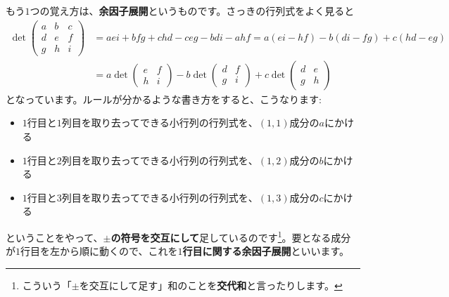 もう$1$つの覚え方は、\textbf{余因子展開}というものです。さっきの行列式をよく見ると
\begin{align*}
\det
\begin{pmatrix}
a & b & c \\
d & e & f \\
g & h & i
\end{pmatrix}
&=  aei + bfg + chd - ceg - bdi - ahf
= a(ei - hf) - b(di - fg) + c(hd - eg) \\
&=
a \det
\begin{pmatrix}
e & f \\
h & i
\end{pmatrix}
- b \det
\begin{pmatrix}
d & f \\
g & i
\end{pmatrix}
+ c \det
\begin{pmatrix}
d & e \\
g & h
\end{pmatrix}
\end{align*}
となっています。ルールが分かるような書き方をすると、こうなります:
\begin{itemize}
\item \uline{$1$}行目と\uline{$1$}列目を取り去ってできる小行列の行列式を、\uline{$(1, 1)$}成分の$a$にかける
\item \uline{$1$}行目と\uline{$2$}列目を取り去ってできる小行列の行列式を、\uline{$(1, 2)$}成分の$b$にかける
\item \uline{$1$}行目と\uline{$3$}列目を取り去ってできる小行列の行列式を、\uline{$(1, 3)$}成分の$c$にかける
\end{itemize}
ということをやって、\textbf{$\pm$の符号を交互にして}足しているのです\footnote{こういう「$\pm$を交互にして足す」和のことを\textbf{交代和}と言ったりします。}。要となる成分が$1$行目を左から順に動くので、これを\textbf{$1$行目に関する余因子展開}といいます。

